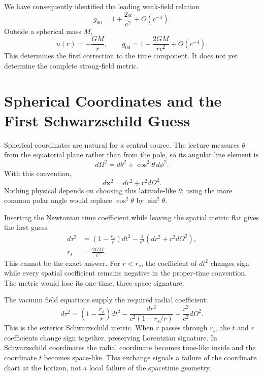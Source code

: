We have consequently identified the leading weak-field relation
\begin{equation}
g_{00}=1+\frac{2u}{c^2}+O(c^{-4}).
\label{eq:l5-g00-newton}
\end{equation}
Outside a spherical mass \(M\),
\begin{equation}
u(r)=-\frac{GM}{r},
\qquad
g_{00}=1-\frac{2GM}{rc^2}+O(c^{-4}).
\label{eq:l5-g00-spherical}
\end{equation}
This determines the first correction to the time component.  It does not yet
determine the complete strong-field metric.

\section{Spherical Coordinates and the First Schwarzschild Guess}

Spherical coordinates are natural for a central source.  The lecture measures
\(\theta\) from the equatorial plane rather than from the pole, so its angular
line element is
\begin{equation}
d\Omega^2=d\theta^2+\cos^2\theta\,d\phi^2.
\label{eq:l5-angular-metric}
\end{equation}
With this convention,
\begin{equation}
d\mathbf{x}^2=dr^2+r^2d\Omega^2.
\label{eq:l5-flat-spherical}
\end{equation}
Nothing physical depends on choosing this latitude-like \(\theta\); using the
more common polar angle would replace \(\cos^2\theta\) by
\(\sin^2\theta\).

Inserting the Newtonian time coefficient while leaving the spatial metric
flat gives the first guess
\begin{equation}
\begin{aligned}
d\tau^2
&=\left(1-\frac{r_s}{r}\right)dt^2
-\frac{1}{c^2}\left(dr^2+r^2d\Omega^2\right),\\
r_s&=\frac{2GM}{c^2}.
\end{aligned}
\label{eq:l5-naive-schwarzschild}
\end{equation}
This cannot be the exact answer.  For \(r<r_s\), the coefficient of \(dt^2\)
changes sign while every spatial coefficient remains negative in the
proper-time convention.  The metric would lose its one-time, three-space
signature.

The vacuum field equations supply the required radial coefficient:
\begin{equation}
\boxed{
d\tau^2
=\left(1-\frac{r_s}{r}\right)dt^2
-\frac{dr^2}{c^2\left(1-r_s/r\right)}
-\frac{r^2}{c^2}d\Omega^2.
}
\label{eq:l5-schwarzschild}
\end{equation}
This is the exterior Schwarzschild metric.  When \(r\) passes through \(r_s\),
the \(t\) and \(r\) coefficients change sign together, preserving Lorentzian
signature.  In Schwarzschild coordinates the radial coordinate becomes
time-like inside and the coordinate \(t\) becomes space-like.  This exchange
signals a failure of the coordinate chart at the horizon, not a local failure
of the spacetime geometry.

